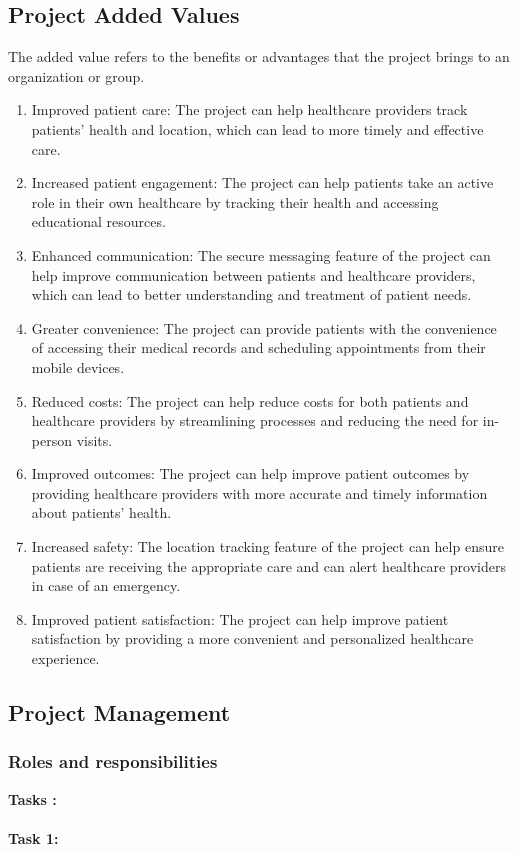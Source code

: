 \documentclass[12pt]{article}
\begin{document}
		\subsection{Project Added Values}
			\quad The added value refers to the benefits or advantages that the project brings to an organization or group.
			\begin{enumerate}
				\item Improved patient care: The project can help healthcare providers track patients' health and location, which can lead to more timely and effective care.
				\item Increased patient engagement: The project can help patients take an active role in their own healthcare by tracking their health and accessing educational resources.
				\item Enhanced communication: The secure messaging feature of the project can help improve communication between patients and healthcare providers, which can lead to better understanding and treatment of patient needs.
				\item Greater convenience: The project can provide patients with the convenience of accessing their medical records and scheduling appointments from their mobile devices.
				\item Reduced costs: The project can help reduce costs for both patients and healthcare providers by streamlining processes and reducing the need for in- person visits.
				\item Improved outcomes: The project can help improve patient outcomes by providing healthcare providers with more accurate and timely information about patients' health.
				\item  Increased safety: The location tracking feature of the project can help ensure patients are receiving the appropriate care and can alert healthcare providers in case of an emergency.
				\item Improved patient satisfaction: The project can help improve patient satisfaction by providing a more convenient and personalized healthcare experience.
			\end{enumerate}
		\subsection{Project Management}
			\subsubsection{Roles and responsibilities}
				\textbf{Tasks :}
				\\
				\\
				\textbf{Task 1:} 
				
\end{document}
